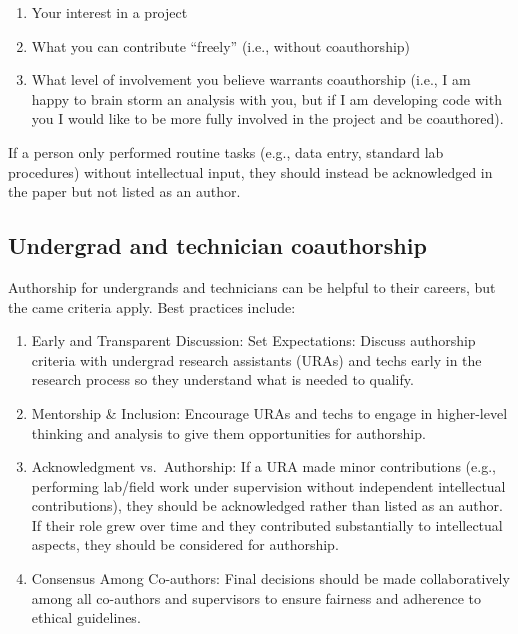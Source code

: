 \documentclass[12pt]{article}
\begin{document}
\begin{enumerate}
\item Your interest in a project
\item What you can contribute ``freely'' (i.e., without coauthorship)
\item What level of involvement you believe warrants coauthorship
  (i.e., I am happy to brain storm an analysis with you, but if I am
  developing code with you I would like to be more fully involved in
  the project and be coauthored). 
\end{enumerate}

If a person only performed routine tasks (e.g., data entry, standard
lab procedures) without intellectual input, they should instead be
acknowledged in the paper but not listed as an author.

\subsection{Undergrad and technician coauthorship}

Authorship for undergrands and technicians can be helpful to their
careers, but the came criteria apply. Best practices include:

\begin{enumerate}
\item Early and Transparent Discussion: Set Expectations: Discuss
  authorship criteria with undergrad research assistants (URAs) and
  techs early in the research process so they understand what is
  needed to qualify.
\item Mentorship \& Inclusion: Encourage URAs and techs to engage in
  higher-level thinking and analysis to give them opportunities for
  authorship.
\item Acknowledgment vs.\ Authorship: If a URA made minor contributions
  (e.g., performing lab/field work under supervision without
  independent intellectual contributions), they should be acknowledged
  rather than listed as an author. If their role grew over time and
  they contributed substantially to intellectual aspects, they should
  be considered for authorship.
\item Consensus Among Co-authors: Final decisions should be made
  collaboratively among all co-authors and supervisors to ensure
  fairness and adherence to ethical guidelines.
\end{enumerate}
\end{document}

